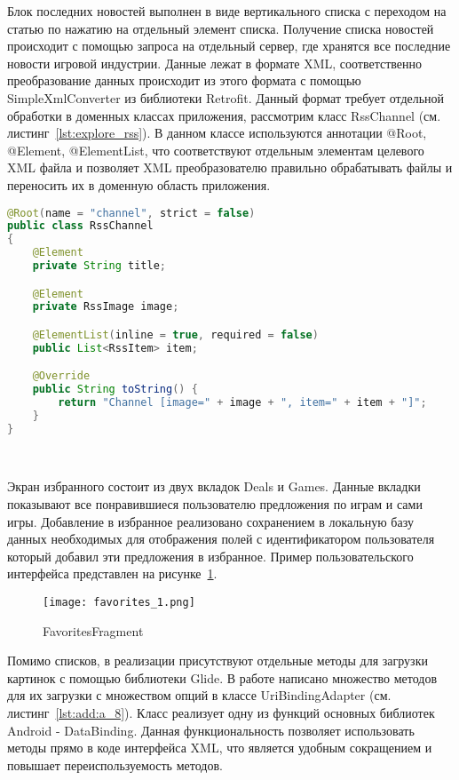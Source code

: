 Блок последних новостей выполнен в виде вертикального списка с переходом на статью по нажатию на отдельный элемент списка. Получение списка новостей происходит с помощью запроса на отдельный сервер, где хранятся все последние новости игровой индустрии. Данные лежат в формате XML, соответственно преобразование данных происходит из этого формата с помощью SimpleXmlConverter из библиотеки Retrofit. Данный формат требует отдельной обработки в доменных классах приложения, рассмотрим класс RssChannel (см. листинг~\ref{lst:explore_rss}). В данном классе используются аннотации @Root, @Element, @ElementList, что соответствуют отдельным элементам целевого XML файла и позволяет XML преобразователю правильно обрабатывать файлы и переносить их в доменную область приложения. 

\begin{lstlisting}[language=Java,label={lst:explore_rss},caption={RssChannel}]
@Root(name = "channel", strict = false)
public class RssChannel
{
    @Element
    private String title;

    @Element
    private RssImage image;

    @ElementList(inline = true, required = false)
    public List<RssItem> item;

    @Override
    public String toString() {
        return "Channel [image=" + image + ", item=" + item + "]";
    }
}
\end{lstlisting}

~\par
Экран избранного состоит из двух вкладок Deals и Games. Данные вкладки показывают все понравившиеся пользователю предложения по играм и сами игры. Добавление в избранное реализовано сохранением в локальную базу данных необходимых для отображения полей с идентификатором пользователя который добавил эти предложения в избранное. Пример пользовательского интерфейса представлен на рисунке~\ref{fig:arch:favorites_1}.

\begin{figure}[H]
 \centering
   \texttt{[image: favorites\_1.png]} 
   \caption{FavoritesFragment}
   \label{fig:arch:favorites_1}
\end{figure}

Помимо списков, в реализации присутствуют отдельные методы для загрузки картинок с помощью библиотеки Glide. В работе написано множество методов для их загрузки с множеством опций в классе UriBindingAdapter (см. листинг~\ref{lst:add:a_8}). Класс реализует одну из функций основных библиотек Android - DataBinding. Данная функциональность позволяет использовать методы прямо в коде интерфейса XML, что является удобным сокращением и повышает переиспользуемость методов.

